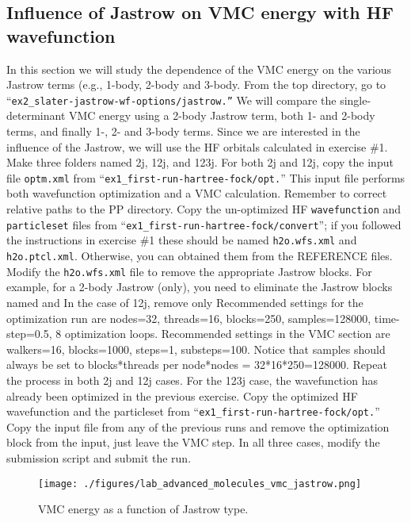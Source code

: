 \subsection{Influence of Jastrow on VMC energy with HF wavefunction}
In this section we will study the dependence of the VMC energy on the various Jastrow
terms (e.g., 1-body, 2-body and 3-body. From the top directory, go to ``\texttt{ex2\_slater-jastrow-wf-options/jastrow.''} 
We will compare the single-determinant VMC energy using a 2-body 
Jastrow term, both 1- and 2-body terms, and finally 1-, 2- and 3-body
terms. Since we are interested in the influence of the Jastrow, we will use the HF orbitals
calculated in exercise \#1. Make three folders named 2j, 12j, and 123j. For both 2j and
12j, %
 copy the input file \texttt{optm.xml} %
from ``\texttt{ex1\_first-run-hartree-fock/opt.}'' This input file performs both wavefunction optimization 
and a VMC calculation. Remember to correct relative paths to the PP directory. Copy the un-optimized HF \texttt{wavefunction} and \texttt{particleset} files
from ``\texttt{ex1\_first-run-hartree-fock/convert}''; if you followed the instructions in exercise \#1 these should be
named \texttt{h2o.wfs.xml} and \texttt{h2o.ptcl.xml}. Otherwise, you can obtained them from the
REFERENCE files. Modify the \texttt{h2o.wfs.xml} file to remove the appropriate Jastrow
blocks. For example, for a 2-body Jastrow (only), you need to eliminate the Jastrow
blocks named  and  In the case of 12j, remove
only  Recommended settings for the optimization run are nodes=32,
threads=16, blocks=250, samples=128000, time-step=0.5, 8 optimization loops. Recommended settings in the
VMC section are walkers=16, blocks=1000, steps=1, substeps=100. Notice that
samples should always be set to blocks*threads per node*nodes = 32*16*250=128000. Repeat 
the process in both 2j and 12j cases. For the 123j case, the wavefunction has
already been optimized in the previous exercise. Copy the optimized HF wavefunction and
the particleset from ``\texttt{ex1\_first-run-hartree-fock/opt.}'' Copy the input file from any of the previous runs and remove the optimization block from the
input, just leave the VMC step. In all three cases, modify the submission script and submit the run.

\begin{figure}
\begin{center}
\texttt{[image: ./figures/lab\_advanced\_molecules\_vmc\_jastrow.png]}
\end{center}
\caption{VMC energy as a function of Jastrow type.}
\label{fig:lam_vmc_jastrow}
\end{figure}

